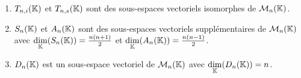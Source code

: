 \documentclass[12pt,a4paper]{report}
\begin{document}
\begin{property}
    \begin{enumerate}
        \item $T_{n,i}(\mathbb{K})$ et $T_{n,s}(\mathbb{K})$ sont des sous-espaces vectoriels isomorphes de $\mathcal M_n(\mathbb{K})$.
        \item $S_n(\mathbb{K})$ et $A_n(\mathbb{K})$ sont des sous-espaces vectoriels supplémentaires de $\mathcal M_n(\mathbb{K})$ avec $\underset{\mathbb{K}}\dim(S_n(\mathbb{K})) = \frac{n(n+1)}{2}$ et $\underset{\mathbb{K}}\dim(A_n(\mathbb{K})) = \frac{n(n-1)}{2}$.
        \item $D_n(\mathbb{K})$ est un sous-espace vectoriel de $\mathcal M_n(\mathbb{K})$ avec $\underset{\mathbb{K}}\dim(D_n(\mathbb{K})) = n$.
    \end{enumerate}
\end{property}
\end{document}
